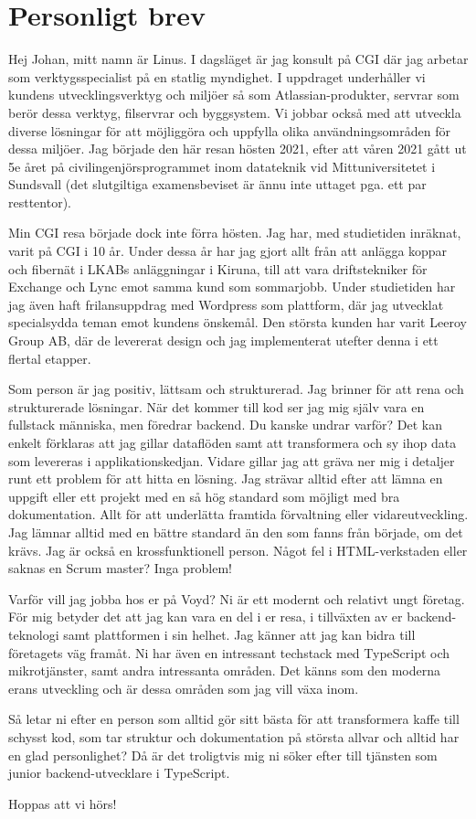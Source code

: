 \section{Personligt brev}
Hej Johan, mitt namn är Linus.
I dagsläget är jag konsult på CGI där jag arbetar som verktygsspecialist på en statlig myndighet.
I uppdraget underhåller vi kundens utvecklingsverktyg och miljöer så som Atlassian-produkter, servrar som berör dessa verktyg, filservrar och byggsystem.
Vi jobbar också med att utveckla diverse lösningar för att möjliggöra och uppfylla olika användningsområden för dessa miljöer.
Jag började den här resan hösten 2021, efter att våren 2021 gått ut 5e året på civilingenjörsprogrammet inom datateknik vid Mittuniversitetet i Sundsvall (det slutgiltiga examensbeviset är ännu inte uttaget pga. ett par resttentor).


\bigskip

Min CGI resa började dock inte förra hösten. 
Jag har, med studietiden inräknat, varit på CGI i 10 år.
Under dessa år har jag gjort allt från att anlägga koppar och fibernät i LKABs anläggningar i Kiruna, till att vara driftstekniker för Exchange och Lync emot samma kund som sommarjobb.
Under studietiden har jag även haft frilansuppdrag med Wordpress som plattform, där jag utvecklat specialsydda teman emot kundens önskemål.
Den största kunden har varit Leeroy Group AB, där de levererat design och jag implementerat utefter denna i ett flertal etapper.

\bigskip

Som person är jag positiv, lättsam och strukturerad. 
Jag brinner för att rena och strukturerade lösningar.
När det kommer till kod ser jag mig själv vara en fullstack människa, men föredrar backend.
Du kanske undrar varför?
Det kan enkelt förklaras att jag gillar dataflöden samt att transformera och sy ihop data som levereras i applikationskedjan.
Vidare gillar jag att gräva ner mig i detaljer runt ett problem för att hitta en lösning.
Jag strävar alltid efter att lämna en uppgift eller ett projekt med en så hög standard som möjligt med bra dokumentation.
Allt för att underlätta framtida förvaltning eller vidareutveckling.
Jag lämnar alltid med en bättre standard än den som fanns från började, om det krävs.
Jag är också en krossfunktionell person.
Något fel i HTML-verkstaden eller saknas en Scrum master?
Inga problem!

\bigskip

Varför vill jag jobba hos er på Voyd?
Ni är ett modernt och relativt ungt företag.
För mig betyder det att jag kan vara en del i er resa, i tillväxten av er backend-teknologi samt plattformen i sin helhet.
Jag känner att jag kan bidra till företagets väg framåt.
Ni har även en intressant techstack med TypeScript och mikrotjänster, samt andra intressanta områden.
Det känns som den moderna erans utveckling och är dessa områden som jag vill växa inom.

\bigskip

Så letar ni efter en person som alltid gör sitt bästa för att transformera kaffe till schysst kod,
som tar struktur och dokumentation på största allvar och alltid har en glad personlighet?
Då är det troligtvis mig ni söker efter till tjänsten som junior backend-utvecklare i TypeScript.

Hoppas att vi hörs!
